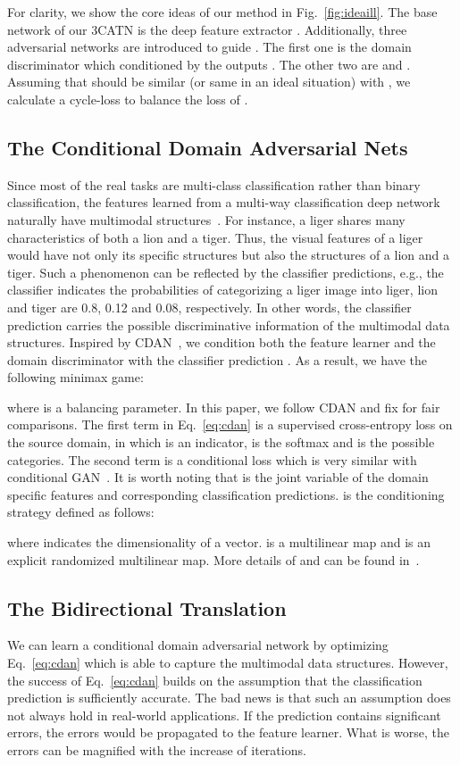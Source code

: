 \documentclass[sigconf]{acmart}
\begin{document}
For clarity, we show the core ideas of our method in Fig.~\ref{fig:ideaill}. The base network of our 3CATN is the deep feature extractor . Additionally, three adversarial networks are introduced to guide . The first one is the domain discriminator  which conditioned by the outputs . The other two are  and . Assuming that  should be similar (or same in an ideal situation) with , we calculate a cycle-loss to balance the loss of . 


\subsection{The Conditional Domain Adversarial Nets}
Since most of the real tasks are multi-class classification rather than binary classification, the features learned from a multi-way classification deep network naturally have multimodal structures~\cite{long2018conditional}. For instance, a liger shares many characteristics of both a lion and a tiger. Thus, the visual features of a liger would have not only its specific structures but also the structures of a lion and a tiger. Such a phenomenon can be reflected by the classifier predictions, e.g., the classifier indicates the probabilities of categorizing a liger image into liger, lion and tiger are 0.8, 0.12 and 0.08, respectively. In other words, the classifier prediction  carries the possible discriminative information of the multimodal data structures. Inspired by CDAN~\cite{long2018conditional}, we condition both the feature learner  and the domain discriminator  with the classifier prediction . As a result, we have the following minimax game:
 
where  is a balancing parameter. In this paper, we follow CDAN and fix  for fair comparisons. The first term in Eq.~\eqref{eq:cdan} is a supervised cross-entropy loss on the source domain, in which  is an indicator,  is the softmax and  is the possible categories. The second term is a conditional loss which is very similar with conditional GAN~\cite{mirza2014conditional}. It is worth noting that  is the joint variable of the domain specific features and corresponding classification predictions.  is the conditioning strategy defined as follows:
 
where  indicates the dimensionality of a vector.  is a multilinear map and  is an explicit randomized multilinear map. More details of  and  can be found in~\cite{long2018conditional}.


\subsection{The Bidirectional Translation}
We can learn a conditional domain adversarial network by optimizing Eq.~\eqref{eq:cdan} which is able to capture the multimodal data structures. However, the success of Eq.~\eqref{eq:cdan} builds on the assumption that the classification prediction  is sufficiently accurate. The bad news is that such an assumption does not always hold in real-world applications. If the prediction contains significant errors, the errors would be propagated to the feature learner. What is worse, the errors can be magnified with the increase of iterations. 
\end{document}
